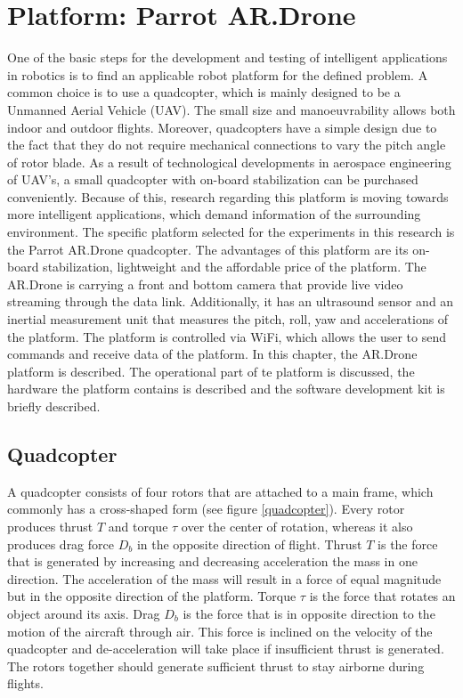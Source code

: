 \documentclass[a4paper]{article}
\begin{document}
\section{Platform: Parrot AR.Drone}
\label{platform}
One of the basic steps for the development and testing of intelligent applications in robotics is to find an applicable robot platform for the defined problem. A common choice is to use a quadcopter, which is  mainly designed to be a Unmanned Aerial Vehicle (UAV). The small size and manoeuvrability allows both indoor and outdoor flights. Moreover, quadcopters have a simple design due to the fact that they do not require mechanical connections to vary the pitch angle of rotor blade.
As a result of technological developments in aerospace engineering of UAV's, a small quadcopter with on-board stabilization can be purchased conveniently. Because of this, research regarding this platform is moving towards more intelligent applications, which demand information of the surrounding environment. The specific platform selected for the experiments in this research is the Parrot AR.Drone quadcopter. The advantages of this platform are its on-board stabilization, lightweight and the affordable price of the platform. The AR.Drone is carrying a front and bottom camera that provide live video streaming through the data link. Additionally, it has an ultrasound sensor and an inertial measurement unit that measures the pitch, roll, yaw and accelerations of the platform. The platform is controlled via WiFi, which allows the user to send commands and receive data of the platform.
In this chapter, the AR.Drone platform is described. The operational part of te platform is discussed, the hardware the platform contains is described and the software development kit is briefly described.

\subsection{Quadcopter}
A quadcopter consists of four rotors that are attached to a main frame, which commonly has a cross-shaped form (see figure \ref{quadcopter}). Every rotor produces thrust $T$ and torque $\tau$ over the center of rotation, whereas it also produces drag force $D_b$ in the opposite direction of flight. Thrust $T$ is the force that is generated by increasing and decreasing acceleration the mass in one direction. The acceleration of the mass will result in a force of equal magnitude but in the opposite direction of the platform. Torque $\tau$ is the force that rotates an object around its axis. Drag $D_b$ is the force that is in opposite direction to the motion of the aircraft through air. This force is inclined on the velocity of the quadcopter and de-acceleration will take place if insufficient thrust is generated. The rotors together should generate sufficient thrust to stay airborne during flights.
\end{document}
